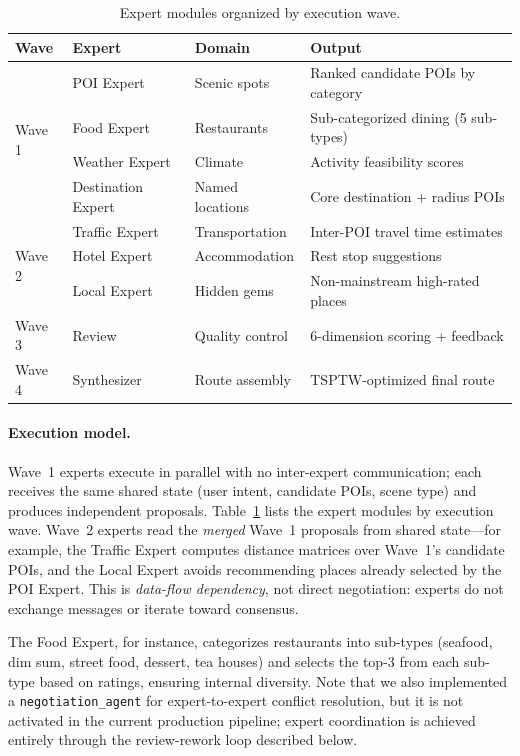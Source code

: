 \begin{table}[H]
\centering
\caption{Expert modules organized by execution wave.}
\label{tab:experts}
\begin{tabular}{@{}llll@{}}
\toprule
\textbf{Wave} & \textbf{Expert} & \textbf{Domain} & \textbf{Output} \\
\midrule
\multirow{4}{*}{Wave 1} & POI Expert & Scenic spots & Ranked candidate POIs by category \\
 & Food Expert & Restaurants & Sub-categorized dining (5 sub-types) \\
 & Weather Expert & Climate & Activity feasibility scores \\
 & Destination Expert & Named locations & Core destination + radius POIs \\
\midrule
\multirow{3}{*}{Wave 2} & Traffic Expert & Transportation & Inter-POI travel time estimates \\
 & Hotel Expert & Accommodation & Rest stop suggestions \\
 & Local Expert & Hidden gems & Non-mainstream high-rated places \\
\midrule
Wave 3 & Review & Quality control & 6-dimension scoring + feedback \\
Wave 4 & Synthesizer & Route assembly & TSPTW-optimized final route \\
\bottomrule
\end{tabular}
\end{table}

\paragraph{Execution model.}
Wave~1 experts execute in parallel with no inter-expert communication; each receives the same shared state (user intent, candidate POIs, scene type) and produces independent proposals. Table~\ref{tab:experts} lists the expert modules by execution wave. Wave~2 experts read the \textit{merged} Wave~1 proposals from shared state---for example, the Traffic Expert computes distance matrices over Wave~1's candidate POIs, and the Local Expert avoids recommending places already selected by the POI Expert. This is \textit{data-flow dependency}, not direct negotiation: experts do not exchange messages or iterate toward consensus.

The Food Expert, for instance, categorizes restaurants into sub-types (seafood, dim sum, street food, dessert, tea houses) and selects the top-3 from each sub-type based on ratings, ensuring internal diversity. Note that we also implemented a \texttt{negotiation\_agent} for expert-to-expert conflict resolution, but it is not activated in the current production pipeline; expert coordination is achieved entirely through the review-rework loop described below.

